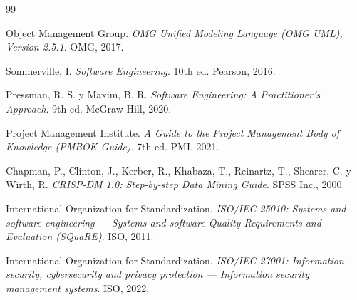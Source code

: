 \documentclass[12pt,letterpaper,oneside]{report}
\begin{document}
\begin{thebibliography}{99}

Object Management Group. \textit{OMG Unified Modeling Language (OMG UML), Version 2.5.1}. OMG, 2017.

Sommerville, I. \textit{Software Engineering}. 10th ed. Pearson, 2016.

Pressman, R. S. y Maxim, B. R. \textit{Software Engineering: A Practitioner's Approach}. 9th ed. McGraw-Hill, 2020.

Project Management Institute. \textit{A Guide to the Project Management Body of Knowledge (PMBOK Guide)}. 7th ed. PMI, 2021.

Chapman, P., Clinton, J., Kerber, R., Khabaza, T., Reinartz, T., Shearer, C. y Wirth, R. \textit{CRISP-DM 1.0: Step-by-step Data Mining Guide}. SPSS Inc., 2000.

International Organization for Standardization. \textit{ISO/IEC 25010: Systems and software engineering --- Systems and software Quality Requirements and Evaluation (SQuaRE)}. ISO, 2011.

International Organization for Standardization. \textit{ISO/IEC 27001: Information security, cybersecurity and privacy protection --- Information security management systems}. ISO, 2022.

\end{thebibliography}
\end{document}

